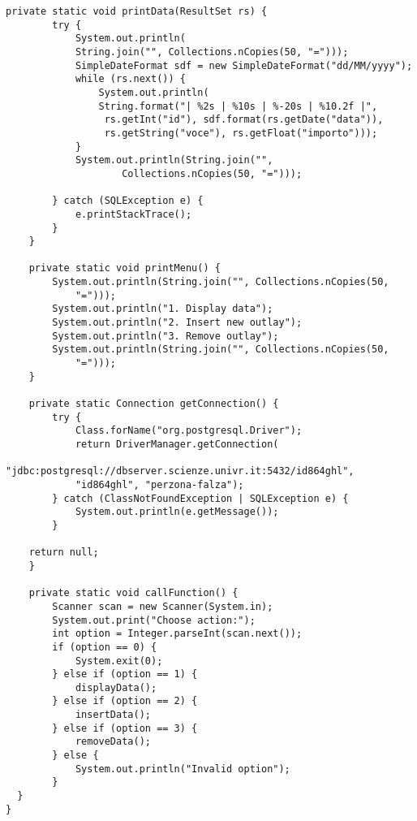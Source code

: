 \documentclass[a4paper, 10pt, titlepage]{article}
\begin{document}
\begin{lstlisting}[tabsize=2]
	private static void printData(ResultSet rs) {
		try {
			System.out.println(
			String.join("", Collections.nCopies(50, "=")));
			SimpleDateFormat sdf = new SimpleDateFormat("dd/MM/yyyy");
			while (rs.next()) {
				System.out.println(
				String.format("| %2s | %10s | %-20s | %10.2f |",
				 rs.getInt("id"), sdf.format(rs.getDate("data")), 
				 rs.getString("voce"), rs.getFloat("importo")));
			}
			System.out.println(String.join("", 
					Collections.nCopies(50, "=")));
		
		} catch (SQLException e) {
			e.printStackTrace();
		}
	}
	
	private static void printMenu() {
		System.out.println(String.join("", Collections.nCopies(50,
			"=")));
		System.out.println("1. Display data");
		System.out.println("2. Insert new outlay");
		System.out.println("3. Remove outlay");
		System.out.println(String.join("", Collections.nCopies(50, 
			"=")));
	}
	
	private static Connection getConnection() {
		try {
			Class.forName("org.postgresql.Driver");
			return DriverManager.getConnection(
			"jdbc:postgresql://dbserver.scienze.univr.it:5432/id864ghl",
			"id864ghl", "perzona-falza");
		} catch (ClassNotFoundException | SQLException e) {
			System.out.println(e.getMessage());
		}
	
	return null;
	}
	
	private static void callFunction() {
		Scanner scan = new Scanner(System.in);
		System.out.print("Choose action:");
		int option = Integer.parseInt(scan.next());
		if (option == 0) {
			System.exit(0);
		} else if (option == 1) {
			displayData();
		} else if (option == 2) {
			insertData();
		} else if (option == 3) {
			removeData();
		} else {
			System.out.println("Invalid option");
		}
  }
}
\end{lstlisting}

\newpage
\end{document}
